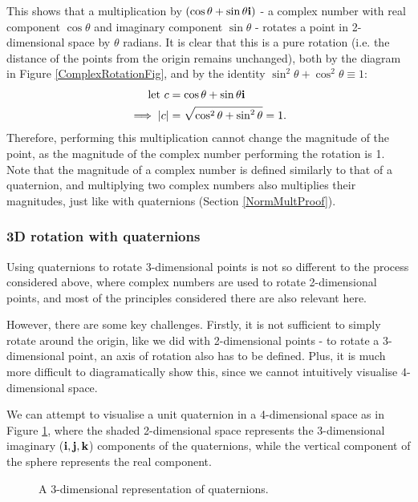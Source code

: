 \documentclass[10pt]{article}
\begin{document}
This shows that a multiplication by $(\cos\theta + \sin\theta\vb{i})$ - a complex number with real component $\cos\theta$ and imaginary component $\sin\theta$ - rotates a point in 2-dimensional space by $\theta$ radians. It is clear that this is a pure rotation (i.e. the distance of the points from the origin remains unchanged), both by the diagram in Figure \ref{ComplexRotationFig}, and by the identity $\sin^2\theta + \cos^2\theta \equiv 1$:
\begin{equation}
    \begin{aligned}
        \text{let } c &= \cos\theta + \sin\theta\vb{i} \\
        \implies \abs{c} &= \sqrt{\cos^2\theta + \sin^2\theta} = 1.
    \end{aligned}
\end{equation}
Therefore, performing this multiplication cannot change the magnitude of the point, as the magnitude of the complex number performing the rotation is 1. Note that the magnitude of a complex number is defined similarly to that of a quaternion, and multiplying two complex numbers also multiplies their magnitudes, just like with quaternions (Section \ref{NormMultProof}).

\subsubsection{3D rotation with quaternions}

Using quaternions to rotate 3-dimensional points is not so different to the process considered above, where complex numbers are used to rotate 2-dimensional points, and most of the principles considered there are also relevant here.

However, there are some key challenges. Firstly, it is not sufficient to simply rotate around the origin, like we did with 2-dimensional points - to rotate a 3-dimensional point, an axis of rotation also has to be defined. Plus, it is much more difficult to diagramatically show this, since we cannot intuitively visualise 4-dimensional space.

We can attempt to visualise a unit quaternion in a 4-dimensional space as in Figure \ref{SphereQuaternionRepresentation}, where the shaded 2-dimensional space represents the 3-dimensional imaginary ($\vb{i, j, k}$) components of the quaternions, while the vertical component of the sphere represents the real component. 

\begin{figure}[ht]
    \centering
    \caption{A 3-dimensional representation of quaternions. \cite{Penguin}}
    \label{SphereQuaternionRepresentation}
\end{figure}
\end{document}
